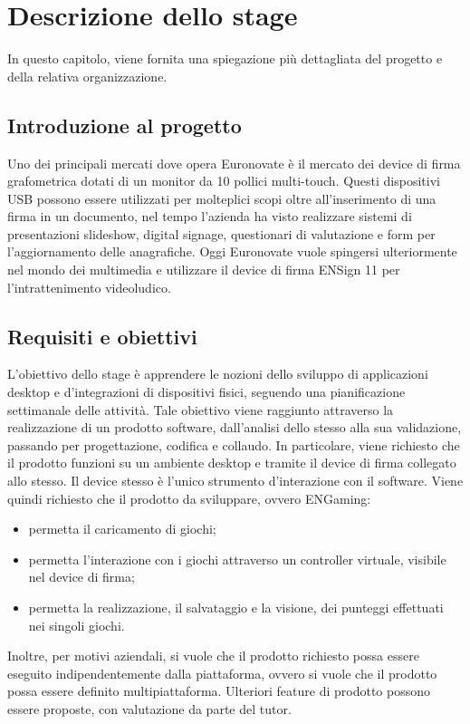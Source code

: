 \chapter{Descrizione dello stage}
\label{cap:descrizione-stage}

In questo capitolo, viene fornita una spiegazione più dettagliata del progetto e della relativa organizzazione.

\section{Introduzione al progetto}

Uno dei principali mercati dove opera Euronovate è il mercato dei device di firma grafometrica
dotati di un monitor da 10 pollici multi-touch. Questi dispositivi USB possono essere utilizzati
per molteplici scopi oltre all'inserimento di una firma in un documento, nel tempo l'azienda ha visto
realizzare sistemi di presentazioni slideshow, digital signage, questionari di valutazione e form
per l'aggiornamento delle anagrafiche. Oggi Euronovate vuole spingersi ulteriormente nel mondo dei
multimedia e utilizzare il device di firma ENSign 11 per l'intrattenimento videoludico.

\section{Requisiti e obiettivi}

L'obiettivo dello stage è apprendere le nozioni dello sviluppo di applicazioni desktop e d'integrazioni di dispositivi fisici, seguendo una pianificazione
settimanale delle attività.
Tale obiettivo viene raggiunto attraverso la realizzazione di un prodotto software, dall'analisi dello stesso alla sua validazione, passando per progettazione, codifica e collaudo.
In particolare, viene richiesto che il prodotto funzioni su un ambiente desktop e tramite il device di firma collegato allo stesso. Il device stesso è l'unico strumento d'interazione con il software.
Viene quindi richiesto che il prodotto da sviluppare, ovvero ENGaming:
\begin{itemize}
    \item permetta il caricamento di giochi;
    \item permetta l'interazione con i giochi attraverso un controller virtuale, visibile nel device di firma;
    \item permetta la realizzazione, il salvataggio e la visione, dei punteggi effettuati nei singoli giochi.
\end{itemize}
Inoltre, per motivi aziendali, si vuole che il prodotto richiesto possa essere eseguito indipendentemente dalla piattaforma, ovvero si vuole che il prodotto possa essere definito multipiattaforma.
Ulteriori feature di prodotto possono essere proposte, con valutazione da parte del tutor.

